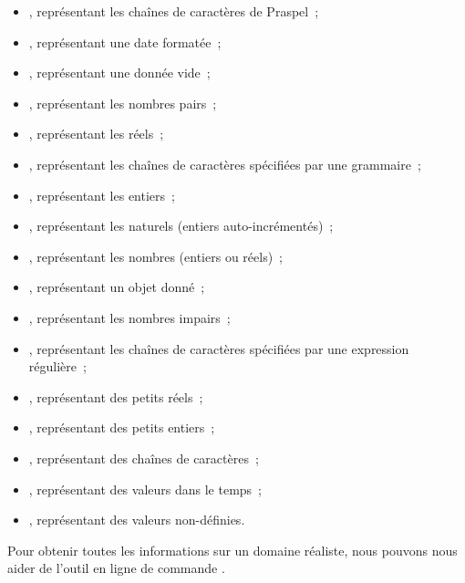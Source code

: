 \begin{itemize}
\item {}, représentant les chaînes de caractères de Praspel~;

\item {}, représentant une date formatée~;

\item {}, représentant une donnée vide~;

\item {}, représentant les nombres pairs~;

\item {}, représentant les réels~;

\item {}, représentant les chaînes de caractères spécifiées par une
grammaire~;

\item {}, représentant les entiers~;

\item {}, représentant les naturels (entiers auto-incrémentés)~;

\item {}, représentant les nombres (entiers ou réels)~;

\item {}, représentant un objet donné~;

\item {}, représentant les nombres impairs~;

\item {}, représentant les chaînes de caractères spécifiées par une
expression régulière~;

\item {}, représentant des petits réels~;

\item {}, représentant des petits entiers~;

\item {}, représentant des chaînes de caractères~;

\item {}, représentant des valeurs dans le temps~;

\item {}, représentant des valeurs non-définies.

\end{itemize}

Pour obtenir toutes les informations sur un domaine réaliste, nous pouvons nous
aider de l'outil en ligne de commande .

